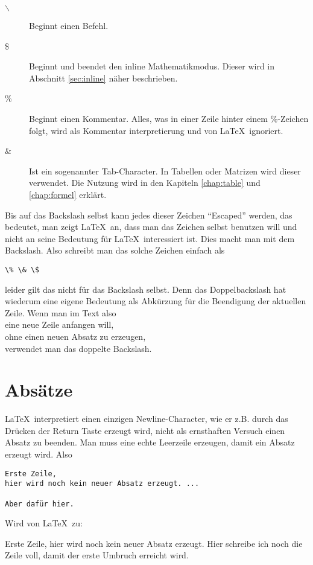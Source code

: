 \begin{description}
\item[$\backslash$] Beginnt einen Befehl.
\item[\$] Beginnt und beendet den inline Mathematikmodus. Dieser wird in Abschnitt \ref{sec:inline} näher beschrieben.
\item[\%] Beginnt einen Kommentar. Alles, was in einer Zeile hinter einem \%-Zeichen folgt, wird als Kommentar interpretierung und von \LaTeX\ ignoriert.
\item[\&] Ist ein sogenannter Tab-Character. In Tabellen oder Matrizen wird dieser verwendet. Die Nutzung wird in den Kapiteln \ref{chap:table} und \ref{chap:formel} erklärt.
\end{description}

Bis auf das Backslash selbst kann jedes dieser Zeichen "`Escaped"' werden, das bedeutet, man zeigt \LaTeX\ an, dass man das Zeichen selbst benutzen will und nicht an seine Bedeutung für \LaTeX\ interessiert ist. Dies macht man mit dem Backslash. Also schreibt man das solche Zeichen einfach als 
\begin{verbatim}
\% \& \$
\end{verbatim}
leider gilt das nicht für das Backslash selbst. Denn das Doppelbackslash hat wiederum eine eigene Bedeutung als Abkürzung für die Beendigung der aktuellen Zeile. Wenn man im Text also \\
eine neue Zeile anfangen will, \\
ohne einen neuen Absatz zu erzeugen, \\
verwendet man das doppelte Backslash.

\section{Absätze}

\LaTeX\ interpretiert einen einzigen Newline-Character, wie er z.B. durch das Drücken der Return Taste erzeugt wird, nicht als ernsthaften Versuch einen Absatz zu beenden. Man muss eine echte Leerzeile erzeugen, damit ein Absatz erzeugt wird. Also
\begin{verbatim}
Erste Zeile,
hier wird noch kein neuer Absatz erzeugt. ...

Aber dafür hier.
\end{verbatim}
Wird von \LaTeX\ zu:

\bigskip
\small

Erste Zeile,
hier wird noch kein neuer Absatz erzeugt. Hier schreibe ich noch die Zeile voll, damit der erste Umbruch erreicht wird.

